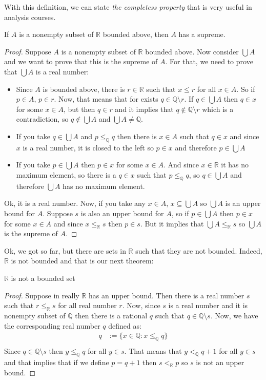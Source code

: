 \documentclass{tufte-handout}
\begin{document}
With this definition, we can state \textit{the completess property} that is very useful in analysis courses.
\begin{theorem}
	If $A$ is a nonempty subset of $\mathbb{R}$ bounded above, then $A$ has a supreme.
\end{theorem}
\begin{proof}
	Suppose $A$ is a nonempty subset of $\mathbb{R}$ bounded above. Now consider $\bigcup A$ and we want to prove that this is the supreme of $A$. For that, we need to prove that $\bigcup A$ is a real number:
	\begin{itemize}
		\item Since $A$ is bounded above, there is $r \in \mathbb{R}$ such that $x \le r$ for all $x \in A$. So if $p \in A$, $p \in r$. Now, that means that for exists $q \in \mathbb{Q} \setminus r$. If $q \in \bigcup A$ then $q \in x$ for some $x\in A$, but then $q \in r$ and it implies that $q \not \in \mathbb{Q} \setminus r$ which is a contradiction, so $q \not \in \bigcup A$ and $\bigcup A \neq \mathbb{Q}$.
		\item If you take $q \in \bigcup A$ and $p \le_\mathbb{Q} q$ then there is $x \in A$ such that $q \in x$ and since $x$ is a real number, it is closed to the left so $p \in x$ and therefore $p \in \bigcup A$
		\item If you take $p \in \bigcup A$ then $p \in x$ for some $x \in A$. And since $x \in \mathbb{R}$ it has no maximum element, so there is a $q \in x$ such that $p \le_\mathbb{Q} q$, so $q \in \bigcup A$ and therefore $\bigcup A$ has no maximum element. 
	\end{itemize}
	Ok, it is a real number. Now, if you take any $x \in A$, $x \subseteq \bigcup A$ so $\bigcup A$ is an upper bound for $A$. Suppose $s$ is also an upper bound for $A$, so if $p \in \bigcup A$ then $p \in x$ for some $x \in A$ and since $x \le_\mathbb{R} s$ then $p \in s$. But it implies that $\bigcup A \le_\mathbb{R} s$ so $\bigcup A$ is the supreme of $A$. 
\end{proof}

Ok, we got so far, but there are sets in $\mathbb{R}$ such that they are not bounded. Indeed, $\mathbb{R}$ is not bounded and that is our next theorem:
\begin{theorem}
	$\mathbb{R}$ is not a bounded set
\end{theorem}
\begin{proof}
	Suppose in really $\mathbb{R}$ has an upper bound. Then there is a real number $s$ such that $r \le_{\mathbb{R}} s$ for all real number $r$. Now, since $s$ is a real number and it is nonempty subset of $\mathbb{Q}$ then there is a rational $q$ such that $q \in \mathbb{Q} \setminus s$. Now, we have the corresponding real number $q$ defined as:
	\begin{align*}
		q &:= \{x \in \mathbb{Q}: x \le_\mathbb{Q} q\}\\
	\end{align*}
	Since $q \in \mathbb{Q} \setminus s$ then $y \le_\mathbb{Q} q$ for all $y \in s$. That means that $y <_\mathbb{Q} q+1$ for all $y \in s$ and that implies that if we define $p = q+1$ then $s <_\mathbb{R} p$ so $s$ is not an upper bound.
\end{proof}
\end{document}
